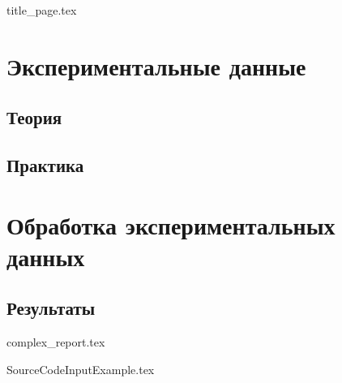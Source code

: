 \documentclass[12pt, a4paper]{article}%
\begin{document}
    {title_page.tex}


    \setcounter{page}{2}
    \tableofcontents

    \newpage
    \section{Экспериментальные данные}

    \subsection{Теория}
    \lipsum[2-4]

    \subsection{Практика}
    \lipsum[2-4]

    \section{Обработка экспериментальных данных}

    \subsection{Результаты}
    \lipsum[2-4]
    \cite{Collaboration2020}
    \cite{Reissel2016}

    \newpage
    {complex_report.tex}

    \newpage
    {SourceCodeInputExample.tex}

    \newpage
    \printbibliography[
    heading=bibintoc,
    ]
    \printbibliography[
    heading=subbibintoc,
    title={Subbibliography}
    ]
\end{document}
